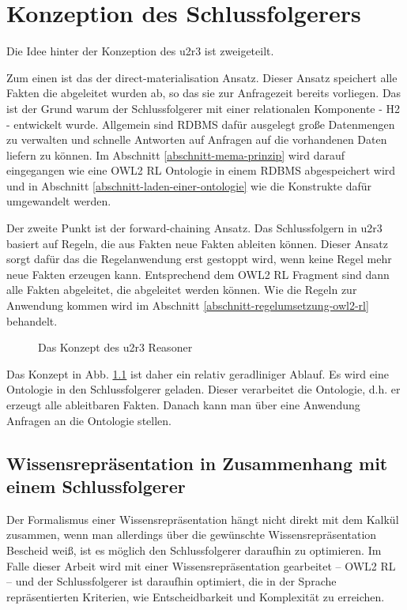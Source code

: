 \chapter{Konzeption des Schlussfolgerers}
Die Idee hinter der Konzeption des u2r3 ist zweigeteilt.

Zum einen ist das der direct-materialisation Ansatz. Dieser Ansatz speichert alle Fakten die abgeleitet wurden ab, so das sie zur Anfragezeit bereits vorliegen. Das ist der Grund warum der Schlussfolgerer mit einer relationalen Komponente - H2 - entwickelt wurde. Allgemein sind RDBMS dafür ausgelegt große Datenmengen zu verwalten und schnelle Antworten auf Anfragen auf die vorhandenen Daten liefern zu können. Im Abschnitt \ref{abschnitt-mema-prinzip} wird darauf eingegangen wie eine OWL2 RL Ontologie in einem RDBMS abgespeichert wird und in Abschnitt \ref{abschnitt-laden-einer-ontologie} wie die Konstrukte dafür umgewandelt werden.

Der zweite Punkt ist der forward-chaining Ansatz. Das Schlussfolgern in u2r3 basiert auf Regeln, die aus Fakten neue Fakten ableiten können. Dieser Ansatz sorgt dafür das die Regelanwendung erst gestoppt wird, wenn keine Regel mehr neue Fakten erzeugen kann. Entsprechend dem OWL2 RL Fragment sind dann alle Fakten abgeleitet, die abgeleitet werden können. Wie die Regeln zur Anwendung kommen wird im Abschnitt \ref{abschnitt-regelumsetzung-owl2-rl} behandelt.

\begin{figure}[htb]
\begin{center}
	\caption{Das Konzept des u2r3 Reasoner}
	\label{image-konzept}
\end{center}
\end{figure}
Das Konzept in Abb. \ref{image-konzept} ist daher ein relativ geradliniger Ablauf. Es wird eine Ontologie in den Schlussfolgerer geladen. Dieser verarbeitet die Ontologie, d.h. er erzeugt alle ableitbaren Fakten. Danach kann man über eine Anwendung Anfragen an die Ontologie stellen.



\section{Wissensrepräsentation in Zusammenhang mit einem Schlussfolgerer}

Der Formalismus einer Wissensrepräsentation hängt nicht direkt mit dem Kalkül zusammen, wenn man allerdings über die gewünschte Wissensrepräsentation Bescheid weiß, ist es möglich den Schlussfolgerer daraufhin zu optimieren. Im Falle dieser Arbeit wird mit einer Wissensrepräsentation gearbeitet -- OWL2 RL -- und der Schlussfolgerer ist daraufhin optimiert, die in der Sprache repräsentierten Kriterien, wie Entscheidbarkeit und Komplexität zu erreichen.

